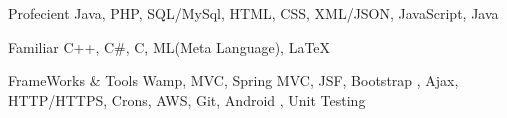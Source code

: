


\begin{cvskills}


\cvskill
{Profecient} %
{ Java, PHP, SQL/MySql, HTML, CSS, XML/JSON, JavaScript, Java} %


\cvskill
{Familiar} %
{ C++, C\#, C, ML(Meta Language), LaTeX} %


\cvskill
{FrameWorks \& Tools} %
{ Wamp, MVC, Spring MVC, JSF, Bootstrap , Ajax, HTTP/HTTPS, Crons, AWS, Git, Android , Unit Testing} %



\end{cvskills}